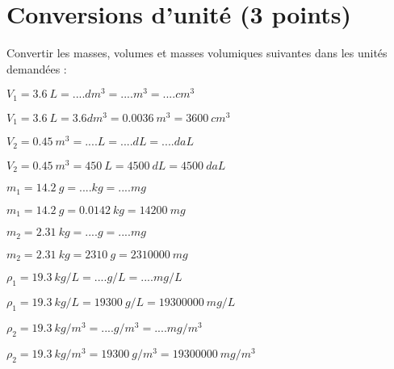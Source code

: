 \section{Conversions d'unité (3 points)}\label{ex:convert}

Convertir les masses, volumes et masses volumiques suivantes dans les unités demandées :
\begin{questions}
	
			
		\question[\half] $V_1 = \num{3.6}\  L = .... dm^3 = .... m^3 = ....cm^3 $
		\begin{solution}
			$V_1 = \num{3.6}\  L = \num{3.6} dm^3 = \num{0.0036}\  m^3 = \num{3600}\  cm^3 $
		\end{solution}
		
		\question[\half] $V_2 = \num{0.45}\  m^3 = .... L = .... dL = .... daL $
		\begin{solution}
			$V_2 = \num{0.45}\  m^3 = \num{450}\  L = \num{4500}\  dL = \num{4500}\  daL $
		\end{solution}
		
		
		\question[\half] $m_1 = \num{14.2}\  g = .... kg = .... mg $
		\begin{solution}
			$m_1 = \num{14.2}\  g = \num{0.0142}\  kg = \num{14200}\  mg $
		\end{solution}
		
		\question[\half] $m_2 = \num{2.31}\  kg = .... g = .... mg $
		\begin{solution}
			$m_2 = \num{2.31}\  kg = \num{2310}\  g = \num{2310000}\  mg $
		\end{solution}
		
		\question[\half] $\rho _1 = \num{19.3}\  kg/L = .... g/L = .... mg/L $
		\begin{solution}
			$\rho _1 = \num{19.3}\  kg/L = \num{19300}\  g/L = \num{19300000}\  mg/L $
		\end{solution}
		
		\question[\half] $\rho _2 = \num{19.3}\  kg/m^3 = .... g/m^3 = .... mg/m^3 $
		\begin{solution}
			$\rho _2
			 = \num{19.3}\  kg/m^3 = \num{19300} \  g/m^3 = \num{19300000} \  mg/m^3 $
		\end{solution}
	
\end{questions}
